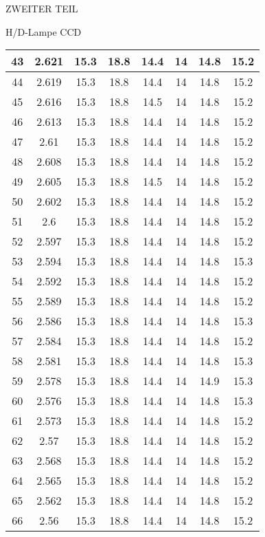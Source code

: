 \begin{appendix}
\begin{chapter}{ZWEITER TEIL}
\begin{section}{H/D-Lampe CCD}
\begin{scriptsize}
\begin{longtable}[htbp]{|c|c|c|c|c|c|c|c|}
            43 & 2.621 & 15.3 & 18.8 & 14.4 & 14 & 14.8 & 15.2 \\ \hline
            44 & 2.619 & 15.3 & 18.8 & 14.4 & 14 & 14.8 & 15.2 \\ \hline
            45 & 2.616 & 15.3 & 18.8 & 14.5 & 14 & 14.8 & 15.2 \\ \hline
            46 & 2.613 & 15.3 & 18.8 & 14.4 & 14 & 14.8 & 15.2 \\ \hline
            47 & 2.61 & 15.3 & 18.8 & 14.4 & 14 & 14.8 & 15.2 \\ \hline
            48 & 2.608 & 15.3 & 18.8 & 14.4 & 14 & 14.8 & 15.2 \\ \hline
            49 & 2.605 & 15.3 & 18.8 & 14.5 & 14 & 14.8 & 15.2 \\ \hline
            50 & 2.602 & 15.3 & 18.8 & 14.4 & 14 & 14.8 & 15.2 \\ \hline
            51 & 2.6 & 15.3 & 18.8 & 14.4 & 14 & 14.8 & 15.2 \\ \hline
            52 & 2.597 & 15.3 & 18.8 & 14.4 & 14 & 14.8 & 15.2 \\ \hline
            53 & 2.594 & 15.3 & 18.8 & 14.4 & 14 & 14.8 & 15.3 \\ \hline
            54 & 2.592 & 15.3 & 18.8 & 14.4 & 14 & 14.8 & 15.2 \\ \hline
            55 & 2.589 & 15.3 & 18.8 & 14.4 & 14 & 14.8 & 15.2 \\ \hline
            56 & 2.586 & 15.3 & 18.8 & 14.4 & 14 & 14.8 & 15.3 \\ \hline
            57 & 2.584 & 15.3 & 18.8 & 14.4 & 14 & 14.8 & 15.2 \\ \hline
            58 & 2.581 & 15.3 & 18.8 & 14.4 & 14 & 14.8 & 15.3 \\ \hline
            59 & 2.578 & 15.3 & 18.8 & 14.4 & 14 & 14.9 & 15.3 \\ \hline
            60 & 2.576 & 15.3 & 18.8 & 14.4 & 14 & 14.8 & 15.3 \\ \hline
            61 & 2.573 & 15.3 & 18.8 & 14.4 & 14 & 14.8 & 15.2 \\ \hline
            62 & 2.57 & 15.3 & 18.8 & 14.4 & 14 & 14.8 & 15.2 \\ \hline
            63 & 2.568 & 15.3 & 18.8 & 14.4 & 14 & 14.8 & 15.2 \\ \hline
            64 & 2.565 & 15.3 & 18.8 & 14.4 & 14 & 14.8 & 15.2 \\ \hline
            65 & 2.562 & 15.3 & 18.8 & 14.4 & 14 & 14.8 & 15.2 \\ \hline
            66 & 2.56 & 15.3 & 18.8 & 14.4 & 14 & 14.8 & 15.2 \\ \hline

\end{longtable}
\end{scriptsize}
\end{section}
\end{chapter}
\end{appendix}
